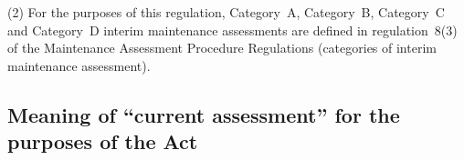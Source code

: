 \documentclass[12pt,a4paper]{article}
\begin{document}
(2) For the purposes of this regulation, Category~A, Category~B, Category~C and
Category~D interim maintenance assessments are defined in regulation~8(3) of the
Maintenance Assessment Procedure Regulations (categories of interim maintenance
assessment).


%
%

\subsection[11A. Meaning of “current assessment” for the purposes of the Act]{Meaning of “current assessment” for the purposes of the Act}
\end{document}
